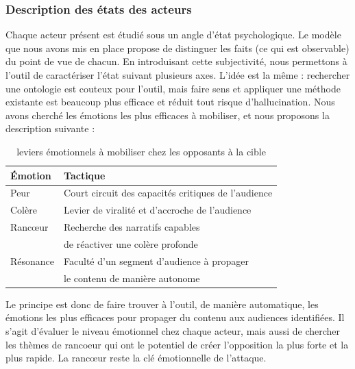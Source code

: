 \documentclass[11pt]{article}
\begin{document}
				
			
				
			\subsubsection*{Description des états des acteurs}
			
				Chaque acteur présent est étudié sous un angle d'état psychologique. Le modèle que nous avons mis en place propose de distinguer les faits (ce qui est observable) du point de vue de chacun. En introduisant cette subjectivité, nous permettons à l'outil de caractériser l'état suivant plusieurs axes. L'idée est la même : rechercher une ontologie est couteux pour l'outil, mais faire sens et appliquer une méthode existante est beaucoup plus efficace et réduit tout risque d'hallucination. Nous avons cherché les émotions les plus efficaces à mobiliser, et nous proposons la description suivante : 
				
				\begin{table}
					\centering
					\begin{tabular}{|l|l|}
						\hline 
						\textbf{Émotion} & \textbf{Tactique} \\
						\hline 
						Peur & Court circuit des capacités critiques de l'audience \\
						\hline 
						Colère & Levier de viralité et d'accroche de l'audience \\
						\hline 
						Rancœur & Recherche des narratifs capables \\
						 & de réactiver une colère profonde \\
						\hline 
						Résonance & Faculté d'un segment d'audience à propager \\
						 & le contenu de manière autonome  \\
						\hline 
					\end{tabular}
					\caption{leviers émotionnels à mobiliser chez les opposants à la cible}
				\end{table}
				
				Le principe est donc de faire trouver à l'outil, de manière automatique, les émotions les plus efficaces pour propager du contenu aux audiences identifiées. Il s'agit d'évaluer le niveau émotionnel chez chaque acteur, mais aussi de chercher les thèmes de rancoeur qui ont le potentiel de créer l'opposition la plus forte et la plus rapide. La rancœur reste la clé émotionnelle de l'attaque. 
				
				
\end{document}
